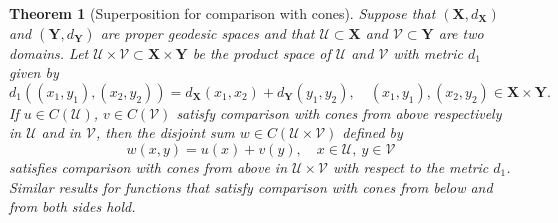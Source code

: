 \documentclass[12pt, reqno]{amsart}
\newtheorem{theorem}{Theorem}
\def\X{{\mathbf X}}
\def\Y{{\mathbf Y}}
\def\U{{\mathcal U}}
\def\V{{\mathcal V}}
\begin{document}
\begin{theorem}[Superposition for comparison with cones]\label{thm superposition1}
Suppose that $(\X, d_\X)$ and $(\Y, d_{\Y})$ are proper geodesic spaces and that $\U\subset \X$ and $\V\subset \Y$ are two domains. Let $\U\times \V\subset \X\times \Y$ be the product space of $\U$ and $\V$ with metric $d_1$ given by %
\begin{equation}\label{product metric}
d_{1}((x_1, y_1), (x_2, y_2))= d_{\X}(x_1, x_2)+ d_{\Y}(y_1, y_2), \quad (x_1, y_1), (x_2, y_2)\in \X\times \Y.
\end{equation}
If $u\in C(\U)$, $v\in C(\V)$  satisfy comparison with cones from above respectively in $\U$ and in $\V$, then the disjoint sum $w\in C(\U\times \V)$ defined by 
\begin{equation}\label{disjoint sum}
w(x, y)=u(x)+v(y), \quad x\in \U,\  y\in \V    
\end{equation}
satisfies comparison with cones from above in $\U\times \V$ with respect to the metric $d_1$. Similar results for functions that satisfy comparison with cones from below and from both sides hold. 
\end{theorem}
\end{document}
